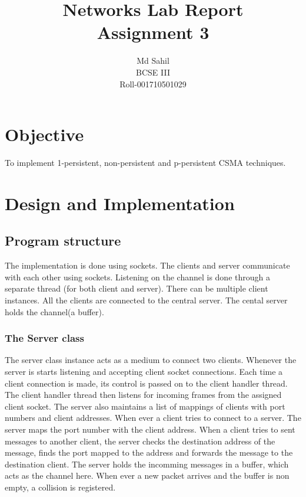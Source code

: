 \documentclass[14pt,titlepage, a4paper]{extarticle}
\title{Networks Lab Report\\Assignment 3}
\author{Md Sahil\\BCSE III\\Roll-001710501029}
\date{}
\begin{document}
{\maketitle}

\section{Objective}
To implement 1-persistent, non-persistent and p-persistent CSMA techniques.

\section{Design and Implementation}

\subsection{Program structure}
The implementation is done using sockets.
The clients and server communicate with each other using sockets.
Listening on the channel is done through a separate 
thread (for both client and server).
There can be multiple client instances. All the clients are connected to the
central server. The cental server holds the channel(a buffer).


\subsubsection{The Server class}
The server class instance acts as a medium to connect two clients. 
Whenever the server is starts listening and accepting client socket
connections. Each time a client connection is made, its control is
passed on to the client handler thread. The client handler thread then 
listens for incoming frames from the assigned client socket.
The server also maintains a list of mappings of clients with port 
numbers and client addresses. When ever a client tries to connect to a server. 
The server maps the port number with the client address.
When a client tries to sent messages to another client, the server checks the
destination address of the message, finds the port mapped to the address
and forwards the message to the destination client.
The server holds the incomming messages in a buffer, which acts as the channel here.
When ever a new packet arrives and the buffer is non empty, a collision is registered.
\par\null\par
{}
\end{document}
